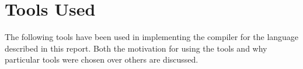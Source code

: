 \chapter{Tools Used}

The following tools have been used in implementing the compiler for the language described in this report. Both the motivation for using the tools and why particular tools were chosen over others are discussed.

